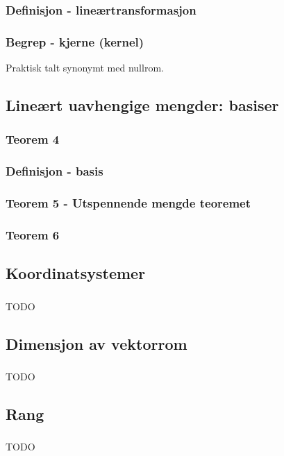 \documentclass{article}
\begin{document}
      \subsubsection{Definisjon - lineærtransformasjon}
        
      \subsubsection{Begrep - kjerne (kernel)}
        Praktisk talt synonymt med nullrom.
    \subsection{Lineært uavhengige mengder: basiser}
      \subsubsection{Teorem 4}
        
      \subsubsection{Definisjon - basis}
        
      \subsubsection{Teorem 5 - Utspennende mengde teoremet}
        
      \subsubsection{Teorem 6}
        
    \subsection{Koordinatsystemer}
      \subsubsection{}
        TODO
    \subsection{Dimensjon av vektorrom}
      \subsubsection{}
        TODO
    \subsection{Rang}
      \subsubsection{}
        TODO
\end{document}
